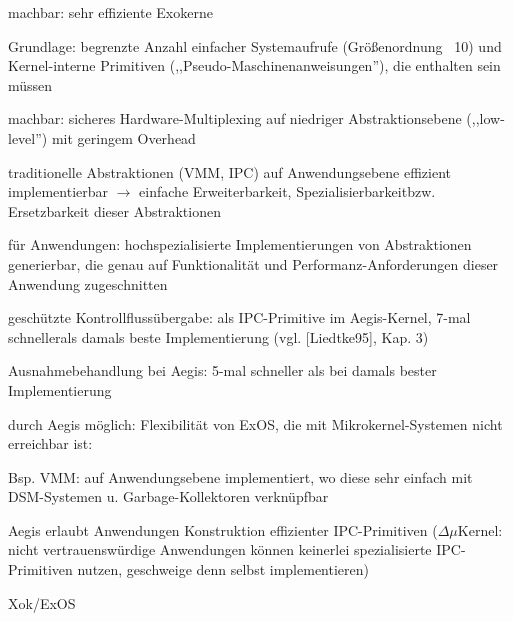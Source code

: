 \documentclass[a4paper]{article}
\begin{document}
\begin{multicols}{3}
    \begin{enumerate*}
        \item machbar: sehr effiziente Exokerne
        \begin{itemize*}
            \item Grundlage: begrenzte Anzahl einfacher Systemaufrufe (Größenordnung ~10) und Kernel-interne Primitiven (,,Pseudo-Maschinenanweisungen''), die enthalten sein müssen
        \end{itemize*}
        \item machbar: sicheres Hardware-Multiplexing auf niedriger
        Abstraktionsebene (,,low-level'') mit geringem Overhead
        \item traditionelle Abstraktionen (VMM, IPC) auf Anwendungsebene effizient
        implementierbar $\rightarrow$ einfache
        Erweiterbarkeit, Spezialisierbarkeitbzw. Ersetzbarkeit dieser
        Abstraktionen
        \item für Anwendungen: hochspezialisierte Implementierungen von
        Abstraktionen generierbar, die genau auf Funktionalität und
        Performanz-Anforderungen dieser Anwendung zugeschnitten
        \item geschützte Kontrollflussübergabe: als IPC-Primitive im Aegis-Kernel,
        7-mal schnellerals damals beste Implementierung (vgl. [Liedtke95],
        Kap. 3)
        \item Ausnahmebehandlung bei Aegis: 5-mal schneller als bei damals bester
        Implementierung
        \item durch Aegis möglich: Flexibilität von ExOS, die mit
        Mikrokernel-Systemen nicht erreichbar ist:
        \begin{itemize*}
            \item Bsp. VMM: auf Anwendungsebene implementiert, wo diese sehr einfach mit DSM-Systemen u. Garbage-Kollektoren verknüpfbar
        \end{itemize*}
        \item Aegis erlaubt Anwendungen Konstruktion effizienter IPC-Primitiven ($\Delta \mu$Kernel: nicht vertrauenswürdige Anwendungen können keinerlei spezialisierte IPC-Primitiven nutzen, geschweige denn selbst implementieren)
    \end{enumerate*}

    Xok/ExOS


\end{multicols}
\end{document}
